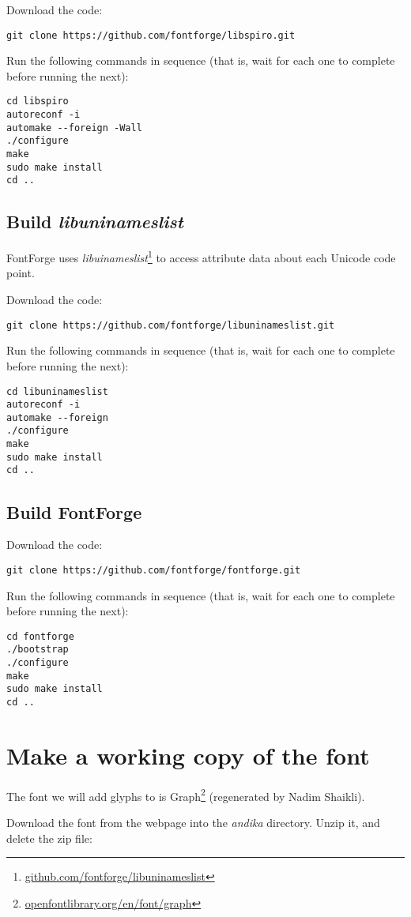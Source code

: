 Download the code:

\verb|git clone https://github.com/fontforge/libspiro.git|

Run the following commands in sequence (that is, wait for each one to complete before running the next):
\begin{verbatim}
cd libspiro
autoreconf -i
automake --foreign -Wall
./configure
make
sudo make install
cd ..
\end{verbatim}

\subsection{Build \textit{libuninameslist}}

FontForge uses \textit{libuinameslist}\footnote{\url{github.com/fontforge/libuninameslist}} to access attribute data about each Unicode code point.

Download the code:

\verb|git clone https://github.com/fontforge/libuninameslist.git|

Run the following commands in sequence (that is, wait for each one to complete before running the next):
\begin{verbatim}
cd libuninameslist
autoreconf -i
automake --foreign
./configure
make
sudo make install
cd ..
\end{verbatim}

\subsection{Build FontForge}

Download the code:

\verb|git clone https://github.com/fontforge/fontforge.git|

Run the following commands in sequence (that is, wait for each one to complete before running the next):
\begin{verbatim}
cd fontforge
./bootstrap
./configure
make
sudo make install
cd ..
\end{verbatim}

\section{Make a working copy of the font}

The font we will add glyphs to is Graph\footnote{\url{openfontlibrary.org/en/font/graph}} (regenerated by Nadim Shaikli).

Download the font from the webpage into the \textit{andika} directory.  Unzip it, and delete the zip file:

